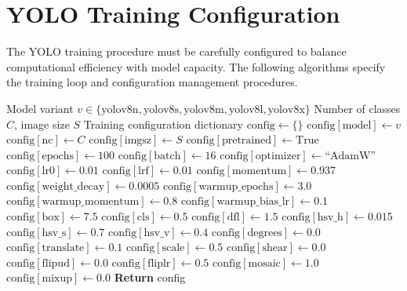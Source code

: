 \section{YOLO Training Configuration}
\label{sec:yolo_config}

The YOLO training procedure must be carefully configured to balance computational efficiency with model capacity. The following algorithms specify the training loop and configuration management procedures.

\begin{algorithm}[H]
\caption{YOLO Training Configuration Setup}
\label{alg:yolo_config}
\begin{algorithmic}[1]
\Require Model variant $v \in \{\text{yolov8n}, \text{yolov8s}, \text{yolov8m}, \text{yolov8l}, \text{yolov8x}\}$
\Require Number of classes $C$, image size $S$
\Ensure Training configuration dictionary
\State $\text{config} \gets \{\}$
\State {}
\State $\text{config}[\text{model}] \gets v$
\State $\text{config}[\text{nc}] \gets C$ 
\State $\text{config}[\text{imgsz}] \gets S$ 
\State $\text{config}[\text{pretrained}] \gets \text{True}$
\State {}
\State $\text{config}[\text{epochs}] \gets 100$
\State $\text{config}[\text{batch}] \gets 16$
\State $\text{config}[\text{optimizer}] \gets \text{``AdamW''}$
\State $\text{config}[\text{lr0}] \gets 0.01$ 
\State $\text{config}[\text{lrf}] \gets 0.01$ 
\State $\text{config}[\text{momentum}] \gets 0.937$
\State $\text{config}[\text{weight\_decay}] \gets 0.0005$
\State $\text{config}[\text{warmup\_epochs}] \gets 3.0$
\State $\text{config}[\text{warmup\_momentum}] \gets 0.8$
\State $\text{config}[\text{warmup\_bias\_lr}] \gets 0.1$
\State {}
\State $\text{config}[\text{box}] \gets 7.5$ 
\State $\text{config}[\text{cls}] \gets 0.5$ 
\State $\text{config}[\text{dfl}] \gets 1.5$ 
\State {}
\State $\text{config}[\text{hsv\_h}] \gets 0.015$ 
\State $\text{config}[\text{hsv\_s}] \gets 0.7$ 
\State $\text{config}[\text{hsv\_v}] \gets 0.4$ 
\State $\text{config}[\text{degrees}] \gets 0.0$ 
\State $\text{config}[\text{translate}] \gets 0.1$ 
\State $\text{config}[\text{scale}] \gets 0.5$ 
\State $\text{config}[\text{shear}] \gets 0.0$ 
\State $\text{config}[\text{flipud}] \gets 0.0$ 
\State $\text{config}[\text{fliplr}] \gets 0.5$ 
\State $\text{config}[\text{mosaic}] \gets 1.0$ 
\State $\text{config}[\text{mixup}] \gets 0.0$ 
\State \textbf{Return} config
\end{algorithmic}
\end{algorithm}

